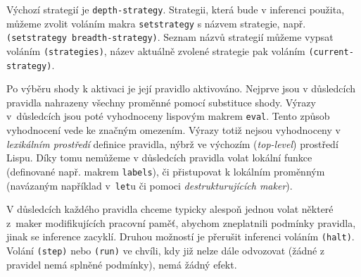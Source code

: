 Výchozí strategií je \verb|depth-strategy|. Strategii, která bude v inferenci
použita, můžeme zvolit voláním makra \verb|setstrategy| s názvem strategie,
např. \verb|(setstrategy breadth-strategy)|. Seznam názvů strategií můžeme
vypsat voláním \verb|(strategies)|, název aktuálně zvolené strategie pak voláním
\verb|(current-strategy)|.

Po výběru shody k aktivaci je její pravidlo aktivováno. Nejprve jsou v
důsledcích pravidla nahrazeny všechny proměnné pomocí substituce shody. Výrazy
v~důsledcích jsou poté vyhodnoceny lispovým makrem \verb|eval|. Tento způsob
vyhodnocení vede ke značným omezením. Výrazy totiž nejsou vyhodnoceny v
\emph{lexikálním prostředí} definice pravidla, nýbrž ve výchozím (\emph{top-level})
prostředí Lispu. Díky tomu nemůžeme v důsledcích pravidla volat lokální funkce
(definované např. makrem \verb|labels|), či přistupovat k lokálním proměnným
(navázaným například v~\verb|let|u či pomoci \emph{destrukturujících maker}).

V důsledcích každého pravidla chceme typicky alespoň jednou volat některé
z~maker modifikujících pracovní paměť, abychom zneplatnili podmínky pravidla,
jinak se inference zacyklí. Druhou možností je přerušit inferenci voláním
\verb|(halt)|. Volání \verb|(step)| nebo \verb|(run)| ve chvíli, kdy již nelze
dále odvozovat (žádné z pravidel nemá splněné podmínky), nemá žádný efekt.
